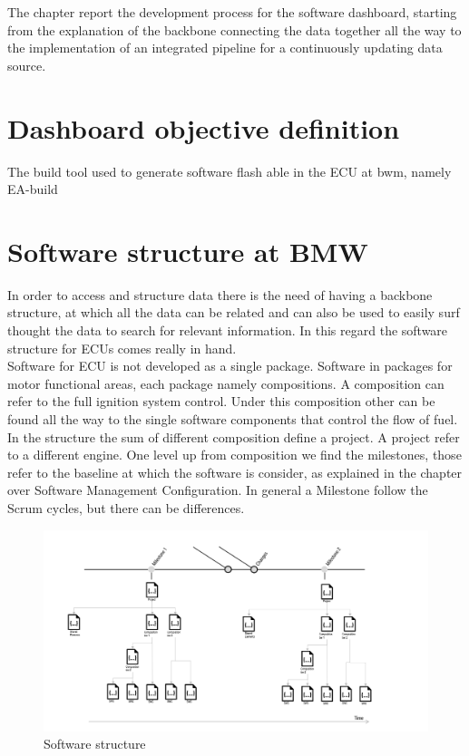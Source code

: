 \documentclass[../main.tex]{subfiles}
\begin{document}
The chapter report the development process for the software dashboard, starting from the explanation of the backbone connecting the data together all the way to the implementation of an integrated pipeline for a continuously updating data source. 
\section{Dashboard objective definition}
The build tool used to generate software flash able in the ECU at bwm, namely EA-build 
\section{Software structure at BMW}
In order to access and structure data there is the need of having a backbone structure, at which all the data can be related and can also be used to easily surf thought the data to search for relevant information. In this regard the software structure for \gls{ECU}s comes really in hand.\\ 
Software for \gls{ECU} is not developed as a single package. Software in packages for motor functional areas, each package namely compositions. A composition can refer to the full ignition system control. Under this composition other can be found all the way to the single software components that control the flow of fuel.\\
In the structure the sum of different composition define a project. A project refer to a different engine. One level up from composition we find the milestones, those refer to the baseline at which the software is consider, as explained in the chapter over Software Management Configuration. In general a Milestone follow the Scrum cycles, but there can be differences. \\
\begin{figure}
    \centering
    \includegraphics[width=1.2\linewidth]{images_folder/softwarestrucutre.png}
    \caption{Software structure}
    \label{fig:SWsTR}
\end{figure}
\end{document}
